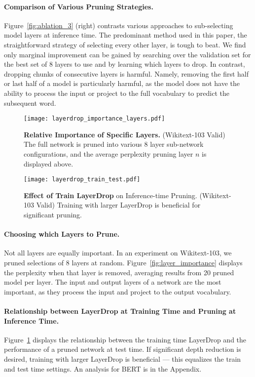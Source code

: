 \paragraph{Comparison of Various Pruning Strategies.}
Figure~\ref{fig:ablation_3} (right) contrasts various approaches to sub-selecting model layers at inference time.
The predominant method used in this paper, the straightforward strategy of selecting every other layer, is tough to beat.
We find only marginal improvement can be gained by searching over the validation set for the best set of 8 layers to use and by learning which layers to drop. In contrast, dropping chunks of consecutive layers is harmful. Namely, removing the first half or last half of a model is particularly harmful, as the model does not have the ability to process the input or project to the full vocabulary to predict the subsequent word.

\begin{figure}[t]
    \centering
    \begin{minipage}[t]{.55\linewidth}
        \texttt{[image: layerdrop\_importance\_layers.pdf]}
        \caption{\textbf{Relative Importance of Specific Layers.} (Wikitext-103 Valid) The full network is pruned into various 8 layer sub-network configurations, and the average perplexity pruning layer $n$ is displayed above.}
    \label{fig:layer_importance}
    \end{minipage}
\hfill
    \centering
    \begin{minipage}[t]{.41\linewidth}
        \texttt{[image: layerdrop\_train\_test.pdf]}
        \caption{\textbf{Effect of Train LayerDrop} on Inference-time Pruning. (Wikitext-103 Valid) Training with larger LayerDrop is beneficial for significant pruning.}
    \label{fig:lm_layerdrop_train}
    \end{minipage}
\end{figure}


\paragraph{Choosing which Layers to Prune.}

Not all layers are equally important.  In an experiment on Wikitext-103, we pruned selections of 8 layers at random. Figure~\ref{fig:layer_importance} displays the perplexity when that layer is removed, averaging results from 20 pruned model per layer. The input and output layers of a network are the most important, as they process the input and project to the output vocabulary.

\paragraph{Relationship between LayerDrop at Training Time and Pruning at Inference Time.}

Figure~\ref{fig:lm_layerdrop_train} displays the relationship between the training time LayerDrop and the performance of a pruned network at test time. If significant depth reduction is desired, training with larger LayerDrop is beneficial --- this equalizes the train and test time settings. An analysis for BERT is in the Appendix.
